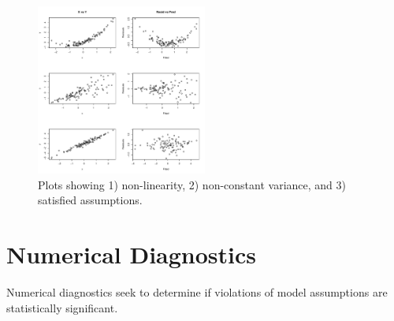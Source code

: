 \documentclass[12pt]{../notes}
\begin{document}
\begin{figure}[H]
\centering
\includegraphics[width = 0.5\textwidth]{../figures/module2/linPlots.pdf}
\caption{Plots showing 1) non-linearity, 2) non-constant variance, and 3) satisfied assumptions.}
\end{figure}

\section{Numerical Diagnostics}
Numerical diagnostics seek to determine if violations of model assumptions are statistically significant. 

\nspace
\end{document}
